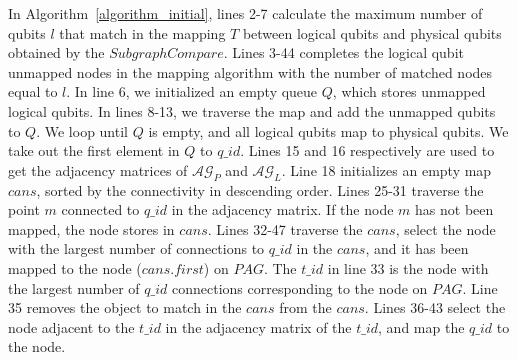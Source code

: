 \documentclass[runningheads]{llncs}
\begin{document}
	In Algorithm~\ref{algorithm_initial}, lines 2-7 calculate the maximum number of qubits $l$ that match in the mapping $T$ between logical qubits and physical qubits obtained by the $SubgraphCompare$. Lines 3-44 completes the logical qubit unmapped nodes in the mapping algorithm with the number of matched nodes equal to $l$. In line 6, we initialized an empty queue $Q$, which stores unmapped logical qubits. In lines 8-13, we traverse the map and add the unmapped qubits to $Q$. We loop until $Q$ is empty, and all logical qubits map to physical qubits. We take out the first element in $Q$ to $q\_id$. Lines 15 and 16 respectively are used to get the adjacency matrices of $\mathcal{AG}_{P}$ and $\mathcal{AG}_{L}$. Line 18 initializes an empty map $cans$, sorted by the connectivity in descending order. Lines 25-31 traverse the point $m$ connected to $q\_id$ in the adjacency matrix. If the node $m$ has not been mapped, the node stores in $cans$. Lines 32-47 traverse the $cans$, select the node with the largest number of connections to $q\_id$ in the $cans$, and it has been mapped to the node ($cans.first$) on $PAG$. The $t\_id$ in line 33 is the node with the largest number of $q\_id$ connections corresponding to the node on $PAG$. Line 35  removes the object to match in the $cans$ from the $cans$. Lines 36-43  select the node adjacent to the $t\_id$ in the adjacency matrix of the $t\_id$, and map the $q\_id$ to the node.
\end{document}
